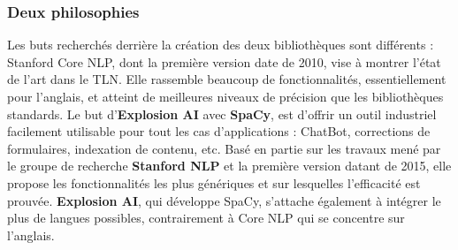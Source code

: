 \subsubsection{Deux philosophies}
Les buts recherchés derrière la création des deux bibliothèques sont différents : Stanford Core NLP, dont la première version date de 2010, vise à montrer l'état de l'art dans le TLN. Elle rassemble beaucoup de fonctionnalités, essentiellement pour l'anglais, et atteint de meilleures niveaux de précision que les bibliothèques standards. Le but d'\textbf{Explosion AI} avec \textbf{SpaCy}, est d'offrir un outil industriel facilement utilisable pour tout les cas d'applications : ChatBot, corrections de formulaires, indexation de contenu, etc. Basé en partie sur les travaux mené par le groupe de recherche \textbf{Stanford NLP} et la première version datant de 2015, elle propose les fonctionnalités les plus génériques et sur lesquelles l'efficacité est prouvée. \textbf{Explosion AI}, qui développe SpaCy, s'attache également à intégrer le plus de langues possibles, contrairement à Core NLP qui se concentre sur l'anglais.
\newline

